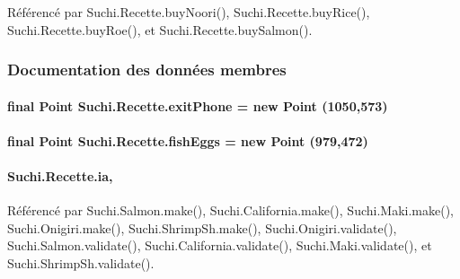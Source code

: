 Référencé par Suchi.\+Recette.\+buy\+Noori(), Suchi.\+Recette.\+buy\+Rice(), Suchi.\+Recette.\+buy\+Roe(), et Suchi.\+Recette.\+buy\+Salmon().



\subsubsection{Documentation des données membres}
\hypertarget{classSuchi_1_1Recette_ac7ff51ea8fa06174c38c52121b0ef767}{}
\paragraph[{exit\+Phone}]{\setlength{\rightskip}{0pt plus 5cm}final Point Suchi.\+Recette.\+exit\+Phone = new Point (1050,573)\hspace{0.3cm}{\ttfamily [protected]}}\label{classSuchi_1_1Recette_ac7ff51ea8fa06174c38c52121b0ef767}
\hypertarget{classSuchi_1_1Recette_a9d19fcc0de54e124694592bc35d97a1d}{}
\paragraph[{fish\+Eggs}]{\setlength{\rightskip}{0pt plus 5cm}final Point Suchi.\+Recette.\+fish\+Eggs = new Point (979,472)\hspace{0.3cm}{\ttfamily [protected]}}\label{classSuchi_1_1Recette_a9d19fcc0de54e124694592bc35d97a1d}
\hypertarget{classSuchi_1_1Recette_add9d95ee8955e02592b553c7e4b719a0}{}
\paragraph[{ia}]{ Suchi.\+Recette.\+ia\hspace{0.3cm}{\ttfamily [static]}, {\ttfamily [protected]}}\label{classSuchi_1_1Recette_add9d95ee8955e02592b553c7e4b719a0}


Référencé par Suchi.\+Salmon.\+make(), Suchi.\+California.\+make(), Suchi.\+Maki.\+make(), Suchi.\+Onigiri.\+make(), Suchi.\+Shrimp\+Sh.\+make(), Suchi.\+Onigiri.\+validate(), Suchi.\+Salmon.\+validate(), Suchi.\+California.\+validate(), Suchi.\+Maki.\+validate(), et Suchi.\+Shrimp\+Sh.\+validate().

